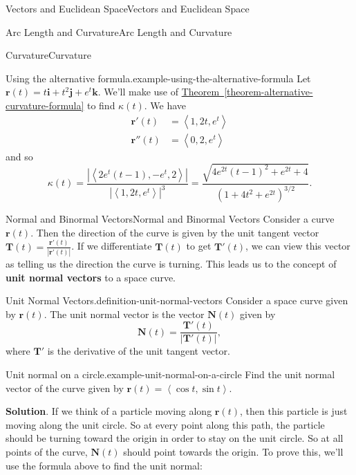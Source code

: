 \documentclass[10pt,]{book}
\newcommand{\terminology}[1]{\textbf{#1}}
\numberwithin{equation}{section}
\newcommand{\vv}[1]{\mathbf{#1}}
\newcommand{\dotprod}[1]{\left\langle #1 \right\rangle}
\begin{document}
\begin{chapterptx}{Vectors and Euclidean Space}{}{Vectors and Euclidean Space}{}{}
\begin{sectionptx}{Arc Length and Curvature}{}{Arc Length and Curvature}{}{}
\begin{subsectionptx}{Curvature}{}{Curvature}{}{}
\begin{example}{Using the alternative formula.}{example-using-the-alternative-formula}
\hypertarget{p-1079}{}%
Let \(\vv{r}(t) = t\vv{i}+t^{2}\vv{j}+e^{t}\vv{k}\). We'll make use of \hyperref[theorem-alternative-curvature-formula]{Theorem~\ref{theorem-alternative-curvature-formula}} to find \(\kappa(t).\) We have%
%
\begin{align*}
\vv{r}'(t) & = \dotprod{1,2t,e^{t}} \\
\vv{r}''(t) & = \dotprod{0,2,e^{t}} 
\end{align*}
\hypertarget{p-1080}{}%
and so%
%
\begin{equation*}
\kappa(t) = \frac{|\dotprod{2e^{t}(t-1),-e^{t},2}|}{|\dotprod{1,2t,e^{t}}|^{3}} = \frac{\sqrt{4e^{2t}(t-1)^{2}+e^{2t}+4}}{(1+4t^{2}+e^{2t})^{3/2}}.
\end{equation*}
\end{example}
\end{subsectionptx}
%
%
\typeout{************************************************}
\typeout{************************************************}
%
\begin{subsectionptx}{Normal and Binormal Vectors}{}{Normal and Binormal Vectors}{}{}\label{subsection-normal-and-binormal-vectors}
\hypertarget{p-1081}{}%
Consider a curve \(\vv{r}(t)\). Then the direction of the curve is given by the unit tangent vector \(\vv{T}(t) = \frac{\vv{r}'(t)}{|\vv{r}'(t)|}\). If we differentiate \(\vv{T}(t)\) to get \(\vv{T}'(t)\), we can view this vector as telling us the direction the curve is turning. This leads us to the concept of \terminology{unit normal vectors} to a space curve.%
\begin{definition}{Unit Normal Vectors.}{definition-unit-normal-vectors}%
\hypertarget{p-1082}{}%
Consider a space curve given by \(\vv{r}(t)\). The unit normal vector is the vector \(\vv{N}(t)\) given by%
%
\begin{equation*}
\vv{N}(t) = \frac{\vv{T}'(t)}{|\vv{T}'(t)|},
\end{equation*}
\hypertarget{p-1083}{}%
where \(\vv{T}'\) is the derivative of the unit tangent vector.%
\end{definition}
\begin{example}{Unit normal on a circle.}{example-unit-normal-on-a-circle}%
\hypertarget{p-1084}{}%
Find the unit normal vector of the curve given by \(\vv{r}(t) = \dotprod{\cos t,\sin t}\).%
\par\smallskip%
\noindent\textbf{Solution}.\hypertarget{solution-166}{}\quad%
\hypertarget{p-1085}{}%
If we think of a particle moving along \(\vv{r}(t)\), then this particle is just moving along the unit circle. So at every point along this path, the particle should be turning toward the origin in order to stay on the unit circle. So at all points of the curve, \(\vv{N}(t)\) should point towards the origin. To prove this, we'll use the formula above to find the unit normal:%

\end{example}
\end{subsectionptx}
\end{sectionptx}
\end{chapterptx}
\end{document}
